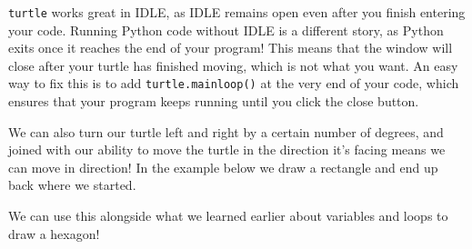 		\begin{aside}
			\texttt{turtle} works great in IDLE, as IDLE remains open even after you finish entering your code. Running Python code without IDLE is a different story, as Python exits once it reaches the end of your program! This means that the window will close after your turtle has finished moving, which is not what you want. An easy way to fix this is to add \texttt{turtle.mainloop()} at the very end of your code, which ensures that your program keeps running until you click the close button.
		\end{aside}

		\newpageprint

		We can also turn our turtle left and right by a certain number of degrees, and joined with our ability to move the turtle in the direction it's facing means we can move in direction! In the example below we draw a rectangle and end up back where we started.

		

		We can use this alongside what we learned earlier about variables and loops to draw a hexagon!

		
